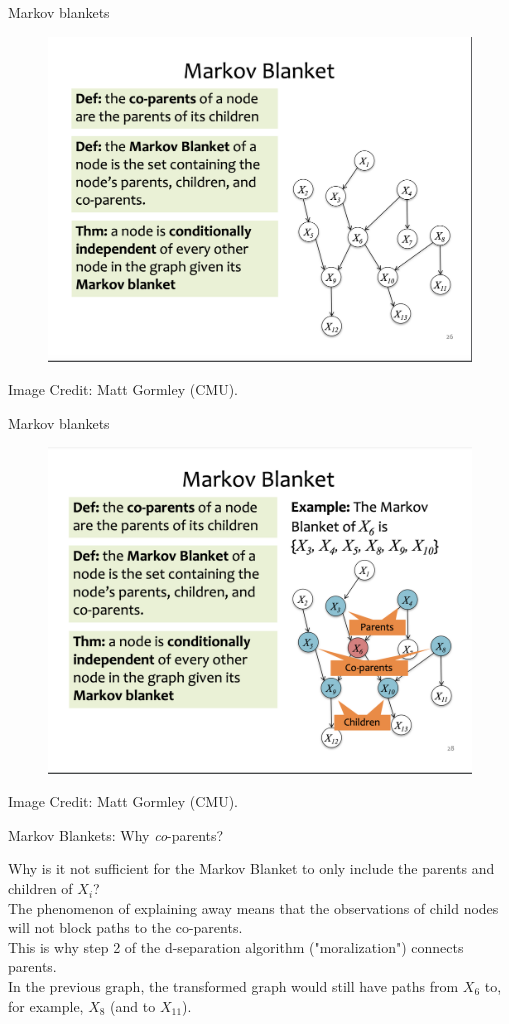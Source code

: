 \documentclass[10pt]{beamer}
\begin{document}
\begin{frame}{Markov blankets}
\begin{figure}[H]
\includegraphics[width=.8\textwidth]{images/markov_blanket_1}
\end{figure} 
\vfill
\tiny \hfill Image Credit: Matt Gormley (CMU). 
 \end{frame}


\begin{frame}{Markov blankets}
\begin{figure}[H]
\includegraphics[width=.8\textwidth]{images/markov_blanket_2}
\end{figure} 
\vfill
\tiny \hfill Image Credit: Matt Gormley (CMU). 
 \end{frame}

\begin{frame}{Markov Blankets: Why \textit{co}-parents?}

Why is it not sufficient for the Markov Blanket to only include the parents and children of $X_i$? \\
\pause
\vfill
The phenomenon of explaining away means that the observations of child nodes will not block paths to the co-parents. \\
\vfill
This is why step 2 of the d-separation algorithm ("moralization") connects parents. \\
\vfill
In the previous graph, the transformed graph would still have paths from $X_6$ to, for example, $X_8$ (and to $X_{11}$).
\end{frame}
\end{document}
